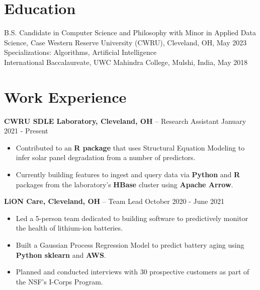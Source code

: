 \documentclass{res}
\begin{document}
 
	\renewcommand{\namefont}{\bfseries\LARGE}
	\renewcommand{\sectionfont}{\bfseries\Large}
	
 
 
\address{ 216-303-2983 \\  rounak@case.edu}
\address{\hfill \href{https://github.com/theroshogolla}{Github: theroshoglla} \\ \hfill \href{https://www.linkedin.com/in/rounakchawla}{LinkedIn: rounakchawla}}
 
\begin{resume} 
 
\section{Education} 
B.S. Candidate in Computer Science and Philosophy with Minor in Applied Data Science, Case Western Reserve University (CWRU), Cleveland, OH, May 2023 \\
Specializations: Algorithms, Artificial Intelligence \\
International Baccalaureate, UWC Mahindra College, Mulshi, India,  May 2018

\section{Work Experience} 

{\large{\bf CWRU SDLE Laboratory, Cleveland, OH} – Research Assistant \hfill January 2021 - Present}
\begin{itemize} \itemsep -2pt
	\item Contributed to an \textbf{R package} that uses Structural Equation Modeling to infer solar panel degradation from a number of predictors.
	\item Currently building features to ingest and query data via \textbf{Python} and \textbf{R} packages from the laboratory's \textbf{HBase} cluster using \textbf{Apache Arrow}.
\end{itemize}

{\large{\bf LiON Care, Cleveland, OH} – Team Lead \hfill October 2020 - June 2021}
\begin{itemize} \itemsep -2pt
	\item Led a 5-person team dedicated to building software to predictively monitor the health of lithium-ion batteries.
	\item Built a Gaussian Process Regression Model to predict battery aging using \textbf{Python sklearn} and \textbf{AWS}.
	\item Planned and conducted interviews with 30 prospective customers as part of the NSF's I-Corps Program.
\end{itemize}


\end{resume}
\end{document}
